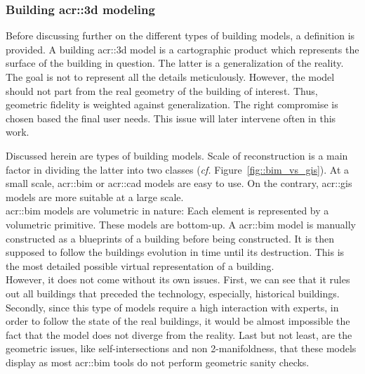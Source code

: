         \subsubsection{Building \gls*{acr::3d} modeling}
            Before discussing further on the different types of building models, a definition is provided.
            A building \gls{acr::3d} model is a cartographic product which represents the surface of the building in question.
            The latter is a generalization of the reality.
            The goal is not to represent all the details meticulously.
            However, the model should not part from the real geometry of the building of interest.
            Thus, geometric fidelity is weighted against generalization.
            The right compromise is chosen based the final user needs.
            This issue will later intervene often in this work.

            Discussed herein are types of building models.
            Scale of reconstruction is a main factor in dividing the latter into two classes (\textit{cf.} Figure~\ref{fig::bim_vs_gis}).
            At a small scale, \gls{acr::bim} or \gls{acr::cad} models are easy to use.
            On the contrary, \gls{acr::gis} models are more suitable at a large scale.\\

            \gls{acr::bim} models are volumetric in nature:
            Each element is represented by a volumetric primitive.
            These models are bottom-up.
            A \gls{acr::bim} model is manually constructed as a blueprints of a building before being constructed.
            It is then supposed to follow the buildings evolution in time until its destruction.
            This is the most detailed possible virtual representation of a building.\\
            However, it does not come without its own issues.
            First, we can see that it rules out all buildings that preceded the technology, especially, historical buildings.
            Secondly, since this type of models require a high interaction with experts, in order to follow the state of the real buildings, it would be almost impossible the fact that the model does not diverge from the reality\addref.
            Last but not least, are the geometric issues, like self-intersections and non 2-manifoldness, that these models display as most \gls{acr::bim} tools do not perform geometric sanity checks.\\

